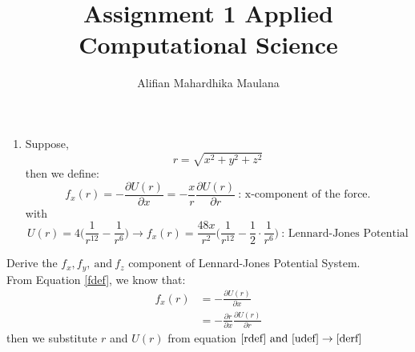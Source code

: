 \documentclass[a4paper,12pt]{article}
\title{Assignment 1 Applied Computational Science}
\author{Alifian Mahardhika Maulana}
\begin{document}
\maketitle
\begin{enumerate}
	\item Suppose,
	\begin{equation}\label{rdef}
	r=\sqrt{x^2+y^2+z^2}
	\end{equation}
	then we define:
	\begin{equation}\label{fdef}
	f_x(r)=-\frac{\partial U(r)}{\partial x} = -\frac{x}{r} \frac{\partial U(r)}{\partial r}\ \text{: x-component of the force.}
	\end{equation}
	with
	\begin{equation}\label{udef}
	U(r) = 4 \bigg(\frac{1}{r^{12}}-\frac{1}{r^6}\bigg) \longrightarrow f_x(r) = \frac{48x}{r^2}\bigg(\frac{1}{r^{12}}-\frac{1}{2}\cdot\frac{1}{r^6}\bigg)\ \text{: Lennard-Jones Potential}
	\end{equation}
\end{enumerate}
Derive the $f_x,f_y,\ \text{and}\ f_z$ component of Lennard-Jones Potential System.\\
\newline
From Equation \eqref{fdef}, we know that:
\begin{equation}\label{derf}
\begin{aligned}
f_x(r) &=-\frac{\partial U(r)}{\partial x}\\
&= -\frac{\partial r}{\partial x}\frac{\partial U(r)}{\partial r}
\end{aligned}
\end{equation}
then we substitute $r$ and $U(r)$ from equation $\eqref{rdef}\ \text{and}\ \eqref{udef} \rightarrow\eqref{derf}$
\end{document}
